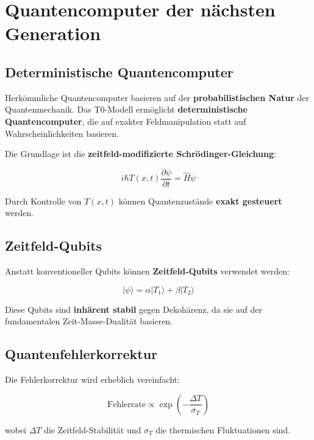 \documentclass[12pt,a4paper]{report}
\begin{document}
	\section{Quantencomputer der nächsten Generation}
	
	\subsection{Deterministische Quantencomputer}
	
	Herkömmliche Quantencomputer basieren auf der \textbf{probabilistischen Natur} der Quantenmechanik. Das T0-Modell ermöglicht \textbf{deterministische Quantencomputer}, die auf exakter Feldmanipulation statt auf Wahrscheinlichkeiten basieren.
	
	Die Grundlage ist die \textbf{zeitfeld-modifizierte Schrödinger-Gleichung}:
	
	\begin{equation}
		i\hbar T(x,t)\frac{\partial\psi}{\partial t} = \hat{H}\psi
	\end{equation}
	
	Durch Kontrolle von $T(x,t)$ können Quantenzustände \textbf{exakt gesteuert} werden.
	
	\subsection{Zeitfeld-Qubits}
	
	Anstatt konventioneller Qubits können \textbf{Zeitfeld-Qubits} verwendet werden:
	
	\begin{equation}
		|\psi\rangle = \alpha|T_1\rangle + \beta|T_2\rangle
	\end{equation}
	
	Diese Qubits sind \textbf{inhärent stabil} gegen Dekohärenz, da sie auf der fundamentalen Zeit-Masse-Dualität basieren.
	
	\subsection{Quantenfehlerkorrektur}
	
	Die Fehlerkorrektur wird erheblich vereinfacht:
	
	\begin{equation}
		\text{Fehlerrate} \propto \exp\left(-\frac{\Delta T}{\sigma_T}\right)
	\end{equation}
	
	wobei $\Delta T$ die Zeitfeld-Stabilität und $\sigma_T$ die thermischen Fluktuationen sind.
	
\end{document}
